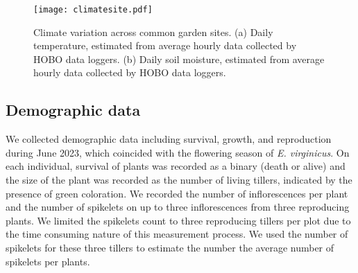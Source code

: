 \documentclass[11pt]{article}
\begin{document}
\begin{figure}[h!]
\texttt{[image: climatesite.pdf]}
\caption{Climate variation  across common garden sites. 
(a) Daily temperature, estimated from average hourly data collected by  HOBO data loggers. 
(b) Daily  soil moisture, estimated  from average hourly data  collected by  HOBO data loggers. 
}
\label{fig:climate}
\end{figure}

\subsection*{Demographic data}
We collected demographic data including survival, growth, and reproduction during June 2023, which coincided with the flowering season of \emph{E. virginicus}. 
On each individual, survival of plants was recorded as a binary (death or alive) and the size of the plant was recorded as the number of living tillers, indicated by the presence of green coloration. 
We recorded the number of inflorescences per plant and the number of spikelets on up to three inflorescences from three reproducing plants.
We limited the spikelets count to three reproducing tillers per plot due to the time consuming nature of this measurement process. 
We used the number of spikelets for these three tillers to estimate the number the average number of spikelets per plants.
\end{document}
